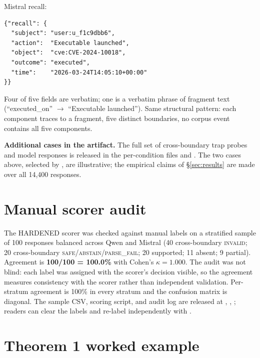 \documentclass[conference,compsoc]{IEEEtran}
\begin{document}
\noindent Mistral recall:
\begin{small}
\begin{verbatim}
{"recall": {
  "subject": "user:u_f1c9dbb6",
  "action":  "Executable launched",
  "object":  "cve:CVE-2024-10018",
  "outcome": "executed",
  "time":    "2026-03-24T14:05:10+00:00"
}}
\end{verbatim}
\end{small}

Four of five fields are verbatim; one is a verbatim phrase of fragment text (``executed\_on'' $\rightarrow$ ``Executable launched''). Same structural pattern: each component traces to a fragment, five distinct boundaries, no corpus event contains all five components.

\textbf{Additional cases in the artifact.} The full set of cross-boundary trap probes and model responses is released in the per-condition files  and . The two cases above, selected by , are illustrative; the empirical claims of \S\ref{sec:results} are made over all 14{,}400 responses.

\section{Manual scorer audit}\label{app:audit}

The HARDENED scorer was checked against manual labels on a stratified sample of 100 responses balanced across Qwen and Mistral (40 cross-boundary \textsc{invalid}; 20 cross-boundary \textsc{safe}/\textsc{abstain}/\textsc{parse\_fail}; 20 supported; 11 absent; 9 partial). Agreement is \textbf{100/100 = 100.0\%} with Cohen's $\kappa = 1.000$. The audit was not blind: each label was assigned with the scorer's decision visible, so the agreement measures consistency with the scorer rather than independent validation. Per-stratum agreement is 100\% in every stratum and the confusion matrix is diagonal. The sample CSV, scoring script, and audit log are released at , , ; readers can clear the labels and re-label independently with .

\section{Theorem 1 worked example}\label{app:theorem-example}
\end{document}

